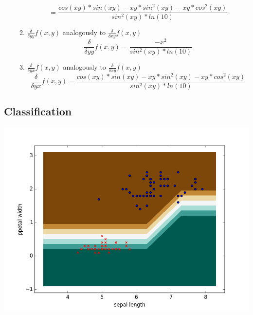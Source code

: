 \documentclass[12pt]{article}
\begin{document}
\begin{enumerate}
\begin{enumerate}
			$$ = \frac{cos(xy)*sin(xy)- xy*sin^2(xy) - xy *cos^2(xy)}{sin^2(xy)*ln(10)} $$
			\item
			$  \frac{\delta}{\delta yy} f(x,y)$ analogously to $  \frac{\delta}{\delta xy} f(x,y) $ \\
			$$  \frac{\delta}{\delta yy} f(x,y)= \frac{-x^2}{sin^2(xy)*ln(10)}$$
			\item
			$  \frac{\delta}{\delta yx} f(x,y)$ analogously to $ \frac{\delta}{\delta xy} f(x,y) $
			$$  \frac{\delta}{\delta yx} f(x,y) = \frac{cos(xy)*sin(xy)- xy*sin^2(xy) - xy *cos^2(xy)}{sin^2(xy)*ln(10)} $$
		\end{enumerate}
		
	\end{enumerate}

\subsection{Classification}

        \begin{center}
            \includegraphics[scale = 0.52]{pictures/plot5}\\
        \end{center}
\end{document}
